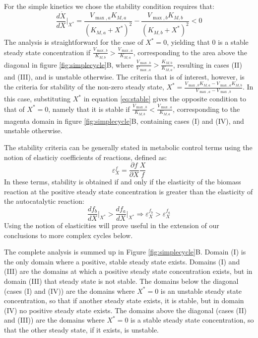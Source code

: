    For the simple kinetics we chose the stability condition requires that:
    \begin{equation}
        \label{eq:stable}
      \frac{d\dot X}{dX}\Big\vert_{X^*} = \frac{V_{\max,a}K_{M,a}}{(K_{M,a}+X^*)^2}-\frac{V_{\max,b}K_{M,b}}{(K_{M,b}+X^*)^2}<0
    \end{equation}
    The analysis is straightforward for the case of $X^*=0$, yielding that $0$ is a stable steady state concentration if $\frac{V_{\max,b}}{K_{M,b}}>\frac{V_{\max,a}}{K_{M,a}}$, corresponding to the area above the diagonal in figure \ref{fig:simplecycle}B, where $\frac{V_{\max,b}}{V_{\max,a}}>\frac{K_{M,b}}{K_{M,a}}$, resulting in cases (II) and (III), and is unstable otherwise.
    The criteria that is of interest, however, is the criteria for stability of the non-zero steady state, $X^*=\frac{V_{\max,b}K_{M,a}-V_{\max,a}K_{M,b}}{V_{\max,a}-V_{\max,b}}$.
    In this case, substituting $X^*$ in equation \ref{eq:stable} gives the opposite condition to that of $X^*=0$, namely that it is stable if $\frac{V_{\max,b}}{K_{M,b}}<\frac{V_{\max,a}}{K_{M,a}}$, corresponding to the magenta domain in figure \ref{fig:simplecycle}B, containing cases (I) and (IV), and unstable otherwise.

    The stability criteria can be generally stated in metabolic control terms \cite{Fell1997-bp} using the notion of elasticiy coefficients of reactions, defined as:
    \begin{equation*}
    \varepsilon^f_X=\frac{\partial f}{\partial X}\frac{X}{f}
    \end{equation*}
    In these terms, stability is obtained if and only if the elasticity of the biomass reaction at the positive steady state concentration is greater than the elasticity of the autocatalytic reaction:
    \begin{equation*}
        \frac{df_b}{dX}\Big\vert_{X^*}>\frac{df_a}{dX}\Big\vert_{X^*} \Rightarrow \varepsilon^{f_b}_X>\varepsilon^{f_a}_X
    \end{equation*}
    Using the notion of elasticities will prove useful in the extension of our conclusions to more complex cycles below.
    
    The complete analysis is summed up in Figure \ref{fig:simplecycle}B.
    Domain (I) is the only domain where a positive, stable steady state exists.
    Domains (I) and (III) are the domains at which a positive steady state concentration exists, but in domain (III) that steady state is not stable.
    The domains below the diagonal (cases (I) and (IV)) are the domains where $X^*=0$ is an unstable steady state concentration, so that if another steady state exists, it is stable, but in domain (IV) no positive steady state exists.
    The domains above the diagonal (cases (II) and (III)) are the domains where $X^*=0$ is a stable steady state concentration, so that the other steady state, if it exists, is unstable.

